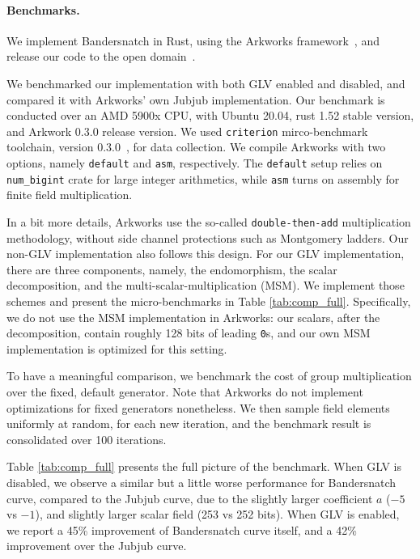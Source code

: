 \documentclass{article}
\theoremstyle{definition}
\begin{document}
\paragraph{Benchmarks.}
We implement Bandersnatch in Rust, using the Arkworks framework~\cite{arkworks}, 
and release our code to the open domain~\cite{arkworks,bandersnatch-rust}. 

We benchmarked our implementation with both GLV enabled and disabled, and 
compared it with Arkworks' own Jubjub implementation. 
Our benchmark is conducted over an AMD 5900x CPU, with Ubuntu 20.04,
rust 1.52 stable version, and Arkwork 0.3.0 release version.
We used \texttt{criterion} mirco-benchmark toolchain,  version 0.3.0~\cite{criterion},
for data collection. We compile Arkworks with two options, namely
\texttt{default} and \texttt{asm}, respectively.
The \texttt{default} setup relies on \texttt{num\_bigint} crate for 
large integer arithmetics, while \texttt{asm}
turns on assembly for finite field multiplication.


In a bit more details, Arkworks use the so-called
\texttt{double-then-add}
multiplication methodology, without side channel protections such 
as Montgomery ladders. Our non-GLV implementation also follows
this design. For our GLV implementation, there are three components,
namely, the endomorphism, the scalar decomposition, and the
multi-scalar-multiplication (MSM). We implement those schemes and 
present the micro-benchmarks in Table \ref{tab:comp_full}.
Specifically, we do not use the MSM implementation in Arkworks:
our scalars, after the decomposition, contain roughly 128 bits
of leading \texttt{0}s, and our own MSM implementation is 
optimized for this setting.

To have a meaningful comparison, we benchmark
the cost of group multiplication over the fixed, default generator.
Note that Arkworks do not implement optimizations for 
fixed generators nonetheless. We then sample field elements 
uniformly at random, for each new iteration, and the benchmark
result is consolidated over 100 iterations.

Table \ref{tab:comp_full} presents the full picture of the benchmark.
When GLV is disabled, we observe a similar but a little worse 
performance for Bandersnatch curve, compared to
the 
Jubjub curve, due to the slightly larger coefficient 
$a$ ($-5$ vs $-1$), 
and slightly larger scalar field (253 vs 252 bits).
When GLV is enabled, we report a 45\% improvement of Bandersnatch curve
itself, and a 42\% improvement over the Jubjub curve.
\end{document}
